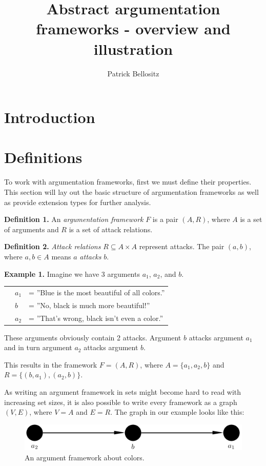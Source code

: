 \documentclass{article}
\newcommand{\nl}{\par\medskip\noindent}
\newcommand{\dl}{\par\bigskip\noindent}
\begin{document}
\title{Abstract argumentation frameworks - overview and illustration}
\author{Patrick Bellositz}
\date{}
\maketitle

\section{Introduction}

\section{Definitions}

To work with argumentation frameworks, first we must define their properties. This section will lay out the basic structure of argumentation frameworks as well as provide extension types for further analysis.\nl

\noindent
\textbf{Definition 1.} An \emph{argumentation framework} $F$ is a pair $(A,R)$, where $A$ is a set of arguments and $R$ is a set of attack relations.\dl
\textbf{Definition 2.} \emph{Attack relations} $R\subseteq A\times A$ represent attacks. The pair $(a,b)$, where $a,b\in A$ means $a$ \emph{attacks} $b$.\dl
\textbf{Example 1.} Imagine we have 3 arguments $a_1$, $a_2$, and $b$.\nl
			\begin{tabular}{p{0.5cm}p{0.5cm}l}
			& $a_1$ & = ''Blue is the most beautiful of all colors.''\\
			& $b$ & = ''No, black is much more beautiful!''\\
			& $a_2$ & = ''That's wrong, black isn't even a color.''
			\end{tabular}\nl
These arguments obviously contain 2 attacks. Argument $b$ attacks argument $a_1$ and in turn argument $a_2$ attacks argument $b$.\nl
This results in the framework $F=(A,R)$, where $A=\{a_1,a_2,b\}$ and $R=\{(b,a_1),(a_2,b)\}$.\dl
As writing an argument framework in sets might become hard to read with increasing set sizes, it is also possible to write every framework as a graph $(V,E)$, where $V=A$ and $E=R$. The graph in our example looks like this:\dl

\FloatBarrier
	\begin{figure}[!htb]
		\centering
		\includegraphics[width=\linewidth]{graphs/ex1.png} %
		\caption{An argument framework about colors.}
	\end{figure}
\FloatBarrier
\end{document}
